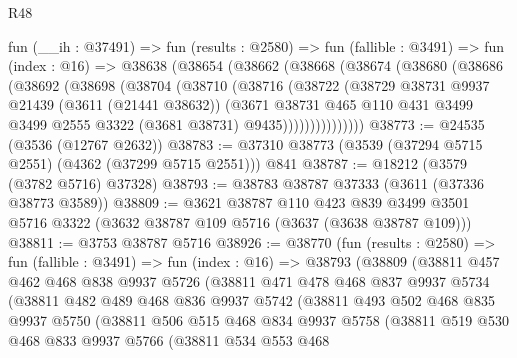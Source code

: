 \begin{lexlean}{R48}
\begin{coremodule}
    fun (__ih : @37491) =>
    fun (results : @2580) =>
    fun (fallible : @3491) =>
    fun (index : @16) =>
    @38638
      (@38654
        (@38662
          (@38668
            (@38674
              (@38680
                (@38686
                  (@38692
                    (@38698
                      (@38704
                        (@38710
                          (@38716
                            (@38722
                              (@38729
                                @38731
                                @9937
                                @21439
                                (@3611 (@21441 @38632))
                                (@3671
                                  @38731
                                  @465
                                  @110
                                  @431
                                  @3499
                                  @3499
                                  @2555
                                  @3322
                                  (@3681 @38731)
                                  @9435)))))))))))))))
@38773 := @24535 (@3536 (@12767 @2632))
@38783 := @37310 @38773 (@3539 (@37294 @5715 @2551) (@4362 (@37299 @5715 @2551))) @841
@38787 := @18212 (@3579 (@3782 @5716) @37328)
@38793 := @38783 @38787 @37333 (@3611 (@37336 @38773 @3589))
@38809 := @3621
    @38787
    @110
    @423
    @839
    @3499
    @3501
    @5716
    @3322
    (@3632 @38787 @109 @5716 (@3637 (@3638 @38787 @109)))
@38811 := @3753 @38787 @5716
@38926 := @38770
    (fun (results : @2580) =>
    fun (fallible : @3491) =>
    fun (index : @16) =>
    @38793
      (@38809
        (@38811
          @457
          @462
          @468
          @838
          @9937
          @5726
          (@38811
            @471
            @478
            @468
            @837
            @9937
            @5734
            (@38811
              @482
              @489
              @468
              @836
              @9937
              @5742
              (@38811
                @493
                @502
                @468
                @835
                @9937
                @5750
                (@38811
                  @506
                  @515
                  @468
                  @834
                  @9937
                  @5758
                  (@38811
                    @519
                    @530
                    @468
                    @833
                    @9937
                    @5766
                    (@38811
                      @534
                      @553
                      @468

\end{coremodule}
\end{lexlean}
